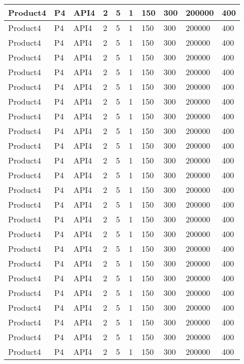 \documentclass{article}
\begin{document}
\begin{longtable}[l]{|p{1.5cm}|p{1.7cm}|p{1cm}|p{1.5cm}|p{1.7cm}|p{1cm}|p{1cm}|p{1cm}|p{1cm}|p{1.5cm}|}
\hline
Product4 & P4 & API4 & 2 & 5 & 1 & 150 & 300 & 200000 & 400\\
\hline
Product4 & P4 & API4 & 2 & 5 & 1 & 150 & 300 & 200000 & 400\\
\hline
Product4 & P4 & API4 & 2 & 5 & 1 & 150 & 300 & 200000 & 400\\
\hline
Product4 & P4 & API4 & 2 & 5 & 1 & 150 & 300 & 200000 & 400\\
\hline
Product4 & P4 & API4 & 2 & 5 & 1 & 150 & 300 & 200000 & 400\\
\hline
Product4 & P4 & API4 & 2 & 5 & 1 & 150 & 300 & 200000 & 400\\
\hline
Product4 & P4 & API4 & 2 & 5 & 1 & 150 & 300 & 200000 & 400\\
\hline
Product4 & P4 & API4 & 2 & 5 & 1 & 150 & 300 & 200000 & 400\\
\hline
Product4 & P4 & API4 & 2 & 5 & 1 & 150 & 300 & 200000 & 400\\
\hline
Product4 & P4 & API4 & 2 & 5 & 1 & 150 & 300 & 200000 & 400\\
\hline
Product4 & P4 & API4 & 2 & 5 & 1 & 150 & 300 & 200000 & 400\\
\hline
Product4 & P4 & API4 & 2 & 5 & 1 & 150 & 300 & 200000 & 400\\
\hline
Product4 & P4 & API4 & 2 & 5 & 1 & 150 & 300 & 200000 & 400\\
\hline
Product4 & P4 & API4 & 2 & 5 & 1 & 150 & 300 & 200000 & 400\\
\hline
Product4 & P4 & API4 & 2 & 5 & 1 & 150 & 300 & 200000 & 400\\
\hline
Product4 & P4 & API4 & 2 & 5 & 1 & 150 & 300 & 200000 & 400\\
\hline
Product4 & P4 & API4 & 2 & 5 & 1 & 150 & 300 & 200000 & 400\\
\hline
Product4 & P4 & API4 & 2 & 5 & 1 & 150 & 300 & 200000 & 400\\
\hline
Product4 & P4 & API4 & 2 & 5 & 1 & 150 & 300 & 200000 & 400\\
\hline
Product4 & P4 & API4 & 2 & 5 & 1 & 150 & 300 & 200000 & 400\\
\hline
Product4 & P4 & API4 & 2 & 5 & 1 & 150 & 300 & 200000 & 400\\
\hline
Product4 & P4 & API4 & 2 & 5 & 1 & 150 & 300 & 200000 & 400\\
\hline
Product4 & P4 & API4 & 2 & 5 & 1 & 150 & 300 & 200000 & 400\\
\hline
Product4 & P4 & API4 & 2 & 5 & 1 & 150 & 300 & 200000 & 400\\

\end{longtable}
\end{document}
